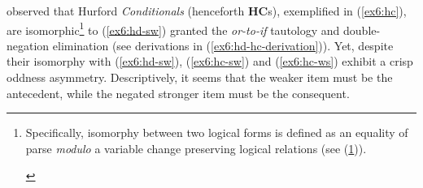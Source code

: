 \begin{exe}
	\ex \label{ex6:hd}
	\begin{xlist}
		\label{ex6:hd-sw}
		\label{ex6:hd-ws}
	\end{xlist}
\end{exe}

\citet{Mandelkern2018} observed that Hurford \textit{Conditionals} (henceforth \textbf{HC}s), exemplified in (\ref{ex6:hc}), are isomorphic\footnote{Specifically, isomorphy between two logical forms is defined as an equality of parse \textit{modulo} a variable change preserving logical relations (see (\ref{ex6:iso})).
\begin{exe}
	\label{ex6:iso}
	\end{exe}} to (\ref{ex6:hd-sw}) granted the \textit{or-to-if} tautology and double-negation elimination (see derivations in (\ref{ex6:hd-hc-derivation})). Yet, despite their isomorphy with (\ref{ex6:hd-sw}), (\ref{ex6:hc-sw}) and (\ref{ex6:hc-ws}) exhibit a crisp oddness asymmetry. Descriptively, it seems that the weaker item must be the antecedent, while the negated stronger item must be the consequent.

\begin{exe}
	\ex \label{ex6:hc}
	\begin{xlist}
		\label{ex6:hc-sw}
		\label{ex6:hc-ws}
	\end{xlist}
\end{exe}

